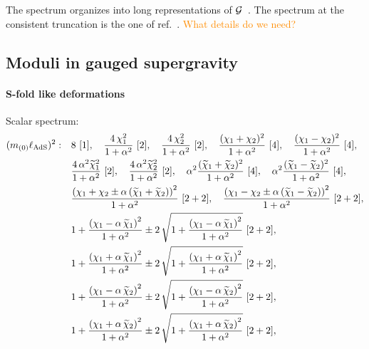 \documentclass[a4paper, 11pt]{article}
\numberwithin{equation}{section}
\newcommand{\+}{\oplus}
\newcommand{\CE}[1]{\textcolor{darkorange}{#1}}
\begin{document}
The spectrum organizes into long representations of ${\cal G}$~\cite{Eberhardt:2017fsi}. The spectrum at the consistent truncation is the one of ref.~\cite{Hohm:2005ui}. \CE{What details do we need?}


\subsection{Moduli in gauged supergravity}
\paragraph{S-fold like deformations} Scalar spectrum:
\begin{equation}
	\begin{aligned}
		(m_{(0)}\ell_{\rm AdS})^2:	\quad 
		&8\ [1],\quad \frac{4\,\chi_{1}^{2}}{1+\alpha^{2}}\ [2], \quad \frac{4\,\chi_{2}^{2}}{1+\alpha^{2}}\ [2], \quad \frac{(\chi_{1}+\chi_{2})^{2}}{1+\alpha^{2}}\ [4], \quad \frac{(\chi_{1}-\chi_{2})^{2}}{1+\alpha^{2}}\ [4],	\\
		&\frac{4\,\alpha^{2}\widetilde{\chi}_{1}^{2}}{1+\alpha^{2}}\ [2], \quad \frac{4\,\alpha^{2}\widetilde{\chi}_{2}^{2}}{1+\alpha^{2}}\ [2], \quad \alpha^{2} \frac{(\widetilde{\chi}_{1}+\widetilde{\chi}_{2})^{2}}{1+\alpha^{2}}\ [4], \quad \alpha^{2} \frac{(\widetilde{\chi}_{1}-\widetilde{\chi}_{2})^{2}}{1+\alpha^{2}}\ [4],	\\
		& \frac{\left(\chi_{1} + \chi_{2} \pm \alpha\,(\widetilde{\chi}_{1}+\widetilde{\chi}_{2})\right)^{2}}{1+\alpha^{2}}\ [2+2], \quad \frac{\left(\chi_{1} - \chi_{2} \pm \alpha\,(\widetilde{\chi}_{1}-\widetilde{\chi}_{2})\right)^{2}}{1+\alpha^{2}}\ [2+2],\\
		&1+\frac{\left(\chi_{1}-\alpha\,\widetilde{\chi}_{1}\right)^{2}}{1+\alpha^{2}} \pm 2\,\sqrt{1+\frac{\left(\chi_{1}-\alpha\,\widetilde{\chi}_{1}\right)^{2}}{1+\alpha^{2}}}\ [2+2], \\
		&1+\frac{\left(\chi_{1}+\alpha\,\widetilde{\chi}_{1}\right)^{2}}{1+\alpha^{2}} \pm 2\,\sqrt{1+\frac{\left(\chi_{1}+\alpha\,\widetilde{\chi}_{1}\right)^{2}}{1+\alpha^{2}}}\ [2+2], \\
		&1+\frac{\left(\chi_{1}-\alpha\,\widetilde{\chi}_{2}\right)^{2}}{1+\alpha^{2}} \pm 2\,\sqrt{1+\frac{\left(\chi_{1}-\alpha\,\widetilde{\chi}_{2}\right)^{2}}{1+\alpha^{2}}}\ [2+2], \\
		&1+\frac{\left(\chi_{1}+\alpha\,\widetilde{\chi}_{2}\right)^{2}}{1+\alpha^{2}} \pm 2\,\sqrt{1+\frac{\left(\chi_{1}+\alpha\,\widetilde{\chi}_{2}\right)^{2}}{1+\alpha^{2}}}\ [2+2], \\

\end{aligned}
\end{equation}
\end{document}
